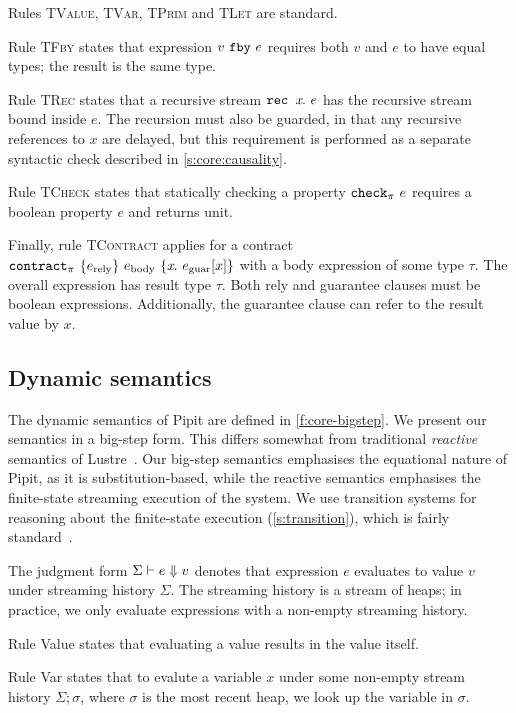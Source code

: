 Rules \textsc{TValue}, \textsc{TVar}, \textsc{TPrim} and \textsc{TLet} are standard.

Rule \textsc{TFby} states that expression $v~\texttt{fby}~e$ requires both $v$ and $e$ to have equal types; the result is the same type.

Rule \textsc{TRec} states that a recursive stream $\texttt{rec~} x\hspace{-0.1em}.~e$ has the recursive stream bound inside $e$.
The recursion must also be guarded, in that any recursive references to $x$ are delayed, but this requirement is performed as a separate syntactic check described in \autoref{s:core:causality}.

Rule \textsc{TCheck} states that statically checking a property $\texttt{check}_{\pi}~e$ requires a boolean property $e$ and returns unit.

Finally, rule \textsc{TContract} applies for a contract $\texttt{contract}_{\pi}~\{e_{\text{rely}}\}~e_{\text{body}}~\{x\hspace{-0.1em}.~e_{\text{guar}}[x]\}$ with a body expression of some type $\tau$.
The overall expression has result type $\tau$.
Both rely and guarantee clauses must be boolean expressions.
Additionally, the guarantee clause can refer to the result value by $x$.

\subsection{Dynamic semantics}


The dynamic semantics of Pipit are defined in \autoref{f:core-bigstep}.
We present our semantics in a big-step form.
This differs somewhat from traditional \emph{reactive} semantics of Lustre~\cite{caspi1995functional}.
Our big-step semantics emphasises the equational nature of Pipit, as it is substitution-based, while the reactive semantics emphasises the finite-state streaming execution of the system.
We use transition systems for reasoning about the finite-state execution (\autoref{s:transition}), which is fairly standard~\cite{brun2023equation,champion2016kind2,raymond2008synchronous}.

The judgment form $\Sigma \vdash e \Downarrow v$ denotes that expression $e$ evaluates to value $v$ under streaming history $\Sigma$.
The streaming history is a stream of heaps; in practice, we only evaluate expressions with a non-empty streaming history.

Rule {\sc Value} states that evaluating a value results in the value itself.

Rule {\sc Var} states that to evalute a variable $x$ under some non-empty stream history $\Sigma; \sigma$, where $\sigma$ is the most recent heap, we look up the variable in $\sigma$.

